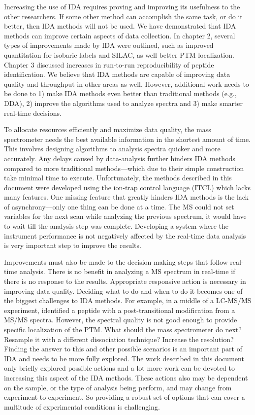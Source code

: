 Increasing the use of IDA requires proving and improving its usefulness to the other researchers. If some other method can accomplish the same task, or do it better, then IDA methods will not be used. We have demonstrated that IDA methods can improve certain aspects of data collection. In chapter 2, several types of improvements made by IDA were outlined, such as improved quantitation for isobaric labels and SILAC, as well better PTM localization. Chapter 3 discussed increases in run-to-run reproducibility of peptide identification. We believe that IDA methods are capable of improving data quality and throughput in other areas as well. However, additional work needs to be done to 1) make IDA methods even better than traditional methods (e.g., DDA), 2) improve the algorithms used to analyze spectra and 3) make smarter real-time decisions.

To allocate resources efficiently and maximize data quality, the mass spectrometer needs the best available information in the shortest amount of time. This involves designing algorithms to analysis spectra quicker and more accurately. Any delays caused by data-analysis further hinders IDA methods compared to more traditional methods---which due to their simple construction take minimal time to execute. Unfortunately, the methods described in this document were developed using the ion-trap control language (ITCL) which lacks many features. One missing feature that greatly hinders IDA methods is the lack of asynchrony---only one thing can be done at a time. The MS could not set variables for the next scan while analyzing the previous spectrum, it would have to wait till the analysis step was complete. Developing a system where the instrument performance is not negatively affected by the real-time data analysis is very important step to improve the results. 

Improvements must also be made to the decision making steps that follow real-time analysis. There is no benefit in analyzing a MS spectrum in real-time if there is no response to the results. Appropriate responsive action is necessary in improving data quality. Deciding what to do and when to do it becomes one of the biggest challenges to IDA methods. For example, in a middle of a LC-MS/MS experiment, \inseq{} identified a peptide with a post-transitional modification from a MS/MS spectra. However, the spectral quality is not good enough to provide specific localization of the PTM. What should the mass spectrometer do next? Resample it with a different dissociation technique? Increase the resolution? Finding the answer to this and other possible scenarios is an important part of IDA and needs to be more fully explored. The work described in this document only briefly explored possible actions and a lot more work can be devoted to increasing this aspect of the IDA methods. These actions also may be dependent on the sample, or the type of analysis being perform, and may change from experiment to experiment. So providing a robust set of options that can cover a multitude of experimental conditions is challenging.


